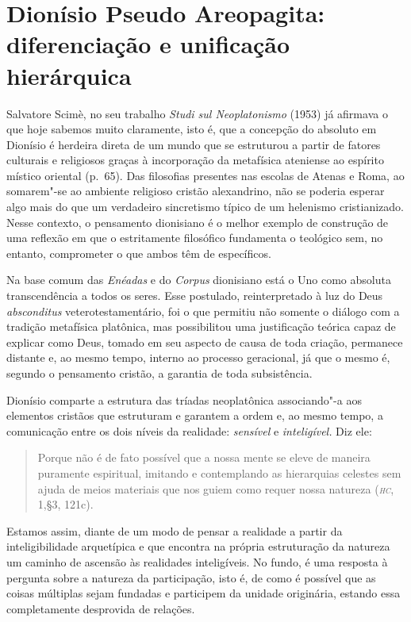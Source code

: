 {\section{Dionísio Pseudo Areopagita: diferenciação e unificação
hierárquica}

Salvatore Scimè, no seu trabalho \emph{Studi sul
Neoplatonismo} (1953) já afirmava o que hoje sabemos muito claramente,
isto é, que a concepção do absoluto em Dionísio é herdeira direta de um
mundo que se estruturou a partir de fatores culturais e religiosos
graças à incorporação da metafísica ateniense ao espírito místico
oriental (p.~65).  Das filosofias presentes nas escolas de Atenas e
Roma, ao somarem"-se ao ambiente religioso cristão alexandrino, não se
poderia esperar algo mais do que um verdadeiro sincretismo típico de um
helenismo cristianizado. Nesse contexto, o pensamento dionisiano é o
melhor exemplo de construção de uma reflexão em que o estritamente
filosófico fundamenta o teológico sem, no entanto, comprometer o que
ambos têm de específicos. 

Na base comum das \emph{Enéadas} e do \emph{Corpus }dionisiano
está o Uno como absoluta transcendência a todos os seres. Esse
postulado, reinterpretado à luz do Deus \emph{absconditus}
veterotestamentário, foi o que permitiu não somente o diálogo com a
tradição metafísica platônica, mas possibilitou uma justificação
teórica capaz de explicar como Deus, tomado em seu aspecto de causa de
toda criação, permanece distante e, ao mesmo tempo, interno ao processo
geracional, já que o mesmo é, segundo o pensamento cristão, a garantia
de toda subsistência.

Dionísio comparte a estrutura das tríadas neoplatônica associando"-a
aos elementos cristãos que estruturam e garantem a ordem e, ao mesmo
tempo, a comunicação entre os dois níveis da realidade:
\emph{sensível} e \emph{inteligível.} Diz ele:

\begin{quote} 
Porque não é de fato possível que a nossa mente se eleve de maneira
puramente espiritual, imitando e contemplando as hierarquias celestes
sem ajuda de meios materiais que nos guiem como requer nossa natureza
(\emph{\textsc{hc}}, 1,§3, 121c).
\end{quote} 

Estamos assim, diante de um modo de pensar a realidade a partir da
inteligibilidade arquetípica e que encontra na própria estruturação da
natureza um caminho de ascensão às realidades inteligíveis. No fundo, é
uma resposta à pergunta sobre a natureza da participação, isto é, de
como é possível que as coisas múltiplas sejam fundadas e participem da
unidade originária, estando essa completamente desprovida de relações. 

}
